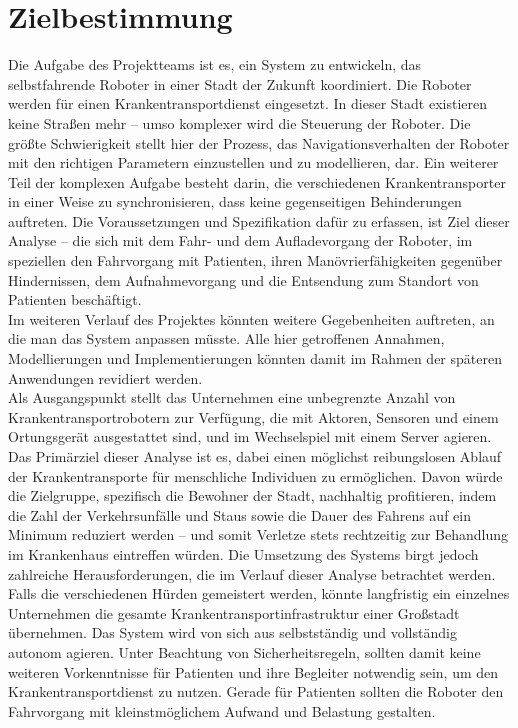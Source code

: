 
\section{Zielbestimmung}
Die Aufgabe des Projektteams ist es, ein System zu entwickeln, das selbstfahrende Roboter in einer Stadt der Zukunft koordiniert. Die Roboter werden für einen Krankentransportdienst eingesetzt. In dieser Stadt existieren keine Straßen mehr – umso komplexer wird die Steuerung der Roboter. Die größte Schwierigkeit stellt hier der Prozess, das Navigationsverhalten der Roboter mit den richtigen Parametern einzustellen und zu modellieren, dar. Ein weiterer Teil der komplexen Aufgabe besteht darin, die verschiedenen Krankentransporter in einer Weise zu synchronisieren, dass keine gegenseitigen Behinderungen auftreten. Die Voraussetzungen und Spezifikation dafür zu erfassen, ist Ziel dieser Analyse – die sich mit dem Fahr- und dem Aufladevorgang der Roboter, im speziellen den Fahrvorgang mit Patienten, ihren Manövrierfähigkeiten gegenüber Hindernissen, dem Aufnahmevorgang und die Entsendung zum Standort von Patienten beschäftigt.\\

Im weiteren Verlauf des Projektes könnten weitere Gegebenheiten auftreten, an die man das System anpassen müsste. Alle hier getroffenen Annahmen, Modellierungen und Implementierungen könnten damit im Rahmen der späteren Anwendungen revidiert werden.\\

Als Ausgangspunkt stellt das Unternehmen eine unbegrenzte Anzahl von Krankentransportrobotern zur Verfügung, die mit Aktoren, Sensoren und einem Ortungsgerät ausgestattet sind, und im Wechselspiel mit einem Server agieren.\\

Das Primärziel dieser Analyse ist es, dabei einen möglichst reibungslosen Ablauf der Krankentransporte für menschliche Individuen zu ermöglichen. Davon würde die Zielgruppe, spezifisch die Bewohner der Stadt, nachhaltig profitieren, indem die Zahl der Verkehrsunfälle und Staus sowie die Dauer des Fahrens auf ein Minimum reduziert werden – und somit Verletze stets rechtzeitig zur Behandlung im Krankenhaus eintreffen würden. Die Umsetzung des Systems birgt jedoch zahlreiche Herausforderungen, die im Verlauf dieser Analyse betrachtet werden. Falls die verschiedenen Hürden gemeistert werden, könnte langfristig ein einzelnes Unternehmen die gesamte Krankentransportinfrastruktur einer Großstadt übernehmen. Das System wird von sich aus selbstständig und vollständig autonom agieren. Unter Beachtung von Sicherheitsregeln, sollten damit keine weiteren Vorkenntnisse für Patienten und ihre Begleiter notwendig sein, um den Krankentransportdienst zu nutzen. Gerade für Patienten sollten die Roboter den Fahrvorgang mit kleinstmöglichem Aufwand und Belastung gestalten.\\
